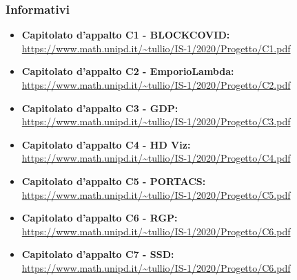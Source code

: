 \subsubsection{Informativi}

\begin{itemize}
\item \textbf {Capitolato d'appalto C1 - BLOCKCOVID:}\\
\url{https://www.math.unipd.it/~tullio/IS-1/2020/Progetto/C1.pdf}
\item \textbf {Capitolato d'appalto C2 - EmporioLambda:}\\
\url{https://www.math.unipd.it/~tullio/IS-1/2020/Progetto/C2.pdf}
\item \textbf {Capitolato d'appalto C3 - GDP:}\\
\url{https://www.math.unipd.it/~tullio/IS-1/2020/Progetto/C3.pdf}
\item \textbf {Capitolato d'appalto C4 - HD Viz:}\\
\url{https://www.math.unipd.it/~tullio/IS-1/2020/Progetto/C4.pdf}
\item \textbf {Capitolato d'appalto C5 - PORTACS:}\\
\url{https://www.math.unipd.it/~tullio/IS-1/2020/Progetto/C5.pdf}
\item \textbf {Capitolato d'appalto C6 - RGP:}\\
\url{https://www.math.unipd.it/~tullio/IS-1/2020/Progetto/C6.pdf}
\item \textbf {Capitolato d'appalto C7 - SSD:}\\
\url{https://www.math.unipd.it/~tullio/IS-1/2020/Progetto/C6.pdf}

\end{itemize}
